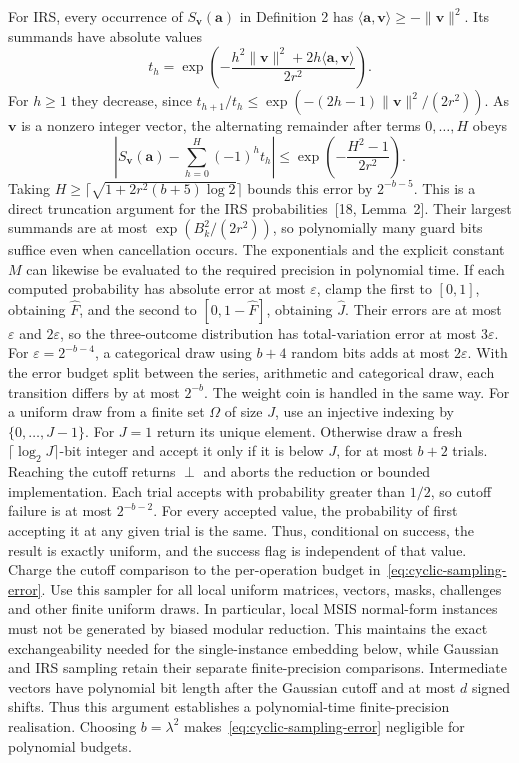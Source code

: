 \documentclass[lettersize,journal]{IEEEtran}
\begin{document}
For IRS, every occurrence of $S_{\mathbf v}(\mathbf a)$ in Definition 2 has $\langle\mathbf a,\mathbf v\rangle\ge-\|\mathbf v\|^2$. Its summands have absolute values
\[
t_h=\exp\left(-\frac{h^2\|\mathbf v\|^2+2h\langle\mathbf a,\mathbf v\rangle}{2r^2}\right).
\]
For $h\ge1$ they decrease, since $t_{h+1}/t_h\le\exp(-(2h-1)\|\mathbf v\|^2/(2r^2))$. As $\mathbf v$ is a nonzero integer vector, the alternating remainder after terms $0,\ldots,H$ obeys
\begin{equation}\label{eq:cyclic-irs-truncation}
	\left|S_{\mathbf v}(\mathbf a)-\sum_{h=0}^{H}(-1)^ht_h\right|
	\le\exp\left(-\frac{H^2-1}{2r^2}\right).
\end{equation}
Taking $H\ge\lceil\sqrt{1+2r^2(b+5)\log2}\rceil$ bounds this error by $2^{-b-5}$. This is a direct truncation argument for the IRS probabilities~[18, Lemma~2]. Their largest summands are at most $\exp(B_k^2/(2r^2))$, so polynomially many guard bits suffice even when cancellation occurs. The exponentials and the explicit constant $M$ can likewise be evaluated to the required precision in polynomial time. If each computed probability has absolute error at most $\varepsilon$, clamp the first to $[0,1]$, obtaining $\widehat F$, and the second to $[0,1-\widehat F]$, obtaining $\widehat J$. Their errors are at most $\varepsilon$ and $2\varepsilon$, so the three-outcome distribution has total-variation error at most $3\varepsilon$. For $\varepsilon=2^{-b-4}$, a categorical draw using $b+4$ random bits adds at most $2\varepsilon$. With the error budget split between the series, arithmetic and categorical draw, each transition differs by at most $2^{-b}$. The weight coin is handled in the same way. For a uniform draw from a finite set $\Omega$ of size $J$, use an injective indexing by $\{0,\ldots,J-1\}$. For $J=1$ return its unique element. Otherwise draw a fresh $\lceil\log_2J\rceil$-bit integer and accept it only if it is below $J$, for at most $b+2$ trials. Reaching the cutoff returns $\perp$ and aborts the reduction or bounded implementation. Each trial accepts with probability greater than $1/2$, so cutoff failure is at most $2^{-b-2}$. For every accepted value, the probability of first accepting it at any given trial is the same. Thus, conditional on success, the result is exactly uniform, and the success flag is independent of that value. Charge the cutoff comparison to the per-operation budget in~\eqref{eq:cyclic-sampling-error}. Use this sampler for all local uniform matrices, vectors, masks, challenges and other finite uniform draws. In particular, local MSIS normal-form instances must not be generated by biased modular reduction. This maintains the exact exchangeability needed for the single-instance embedding below, while Gaussian and IRS sampling retain their separate finite-precision comparisons. Intermediate vectors have polynomial bit length after the Gaussian cutoff and at most $d$ signed shifts. Thus this argument establishes a polynomial-time finite-precision realisation. Choosing $b=\lambda^2$ makes~\eqref{eq:cyclic-sampling-error} negligible for polynomial budgets.
\end{document}
